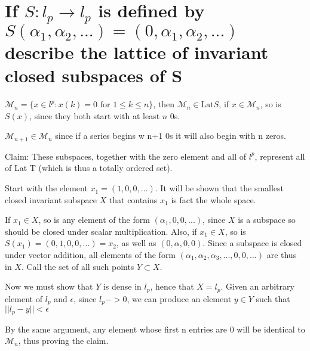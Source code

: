 \documentclass{article}
\begin{document}
\section{If $S:l_p \to l_p$ is defined by $S(\alpha_1, \alpha_2, ...) =(0, \alpha_1, \alpha_2, ...)$ describe the lattice of invariant closed subspaces of S}

$\mathscr{M}_n=\{x\in l^p:x(k)=0 \text{ for } 1 \le k \le n\}$, then $\mathscr{M}_n \in \text{Lat}S$, if $x \in \mathscr{M}_n$, so is $S(x)$, since they both start with at least $n$ 0s.

$\mathscr{M}_{n+1} \in \mathscr{M}_n$ since if a series begins w n+1 0s it will also begin with n zeros.

Claim: These subspaces, together with the zero element and all of $l^p$, represent all of Lat T (which is thus a totally ordered set).

Start with the element $x_1=(1, 0, 0, ...)$. It will be shown that the smallest closed invariant subspace $X$ that contains $x_1$ is fact the whole space.

If $x_1 \in X$, so is any element of the form $(\alpha_1, 0, 0, ...)$, since $X$ is a subspace so should be closed under scalar multiplication. Also, if $x_1 \in X$, so is $S(x_1) = (0, 1, 0, 0, ...) = x_2$, as well as $(0, \alpha, 0, 0)$. Since a subspace is closed under vector addition, all elements of the form $(\alpha_1, \alpha_2, \alpha_3, ..., 0, 0, ...)$ are thus in $X$. Call the set of all such points $Y \subset X$.

Now we must show that $Y$ is dense in $l_p$, hence that $X=l_p$. Given an arbitrary element of $l_p$ and $\epsilon$, since $l_p -> 0$, we can produce an element $y \in Y$ such that $|| l_p - y || < \epsilon$

By the same argument, any element whose first n entries are 0 will be identical to $\mathscr{M}_n$, thus proving the claim.
\end{document}
